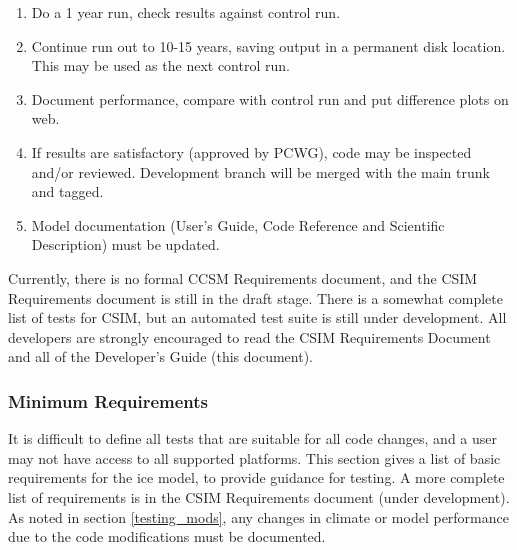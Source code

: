 \begin{enumerate}
  \item  Do a 1 year run, check results against control run.

  \item  Continue run out to 10-15 years, saving output in a permanent disk location.
         This may be used as the next control run.

  \item  Document performance, compare with control run and put difference plots on web.

  \item  If results are satisfactory (approved by PCWG), code may be inspected
         and/or reviewed. Development branch will be merged with the main trunk
         and tagged.

  \item  Model documentation (User's Guide, Code Reference and Scientific Description)
         must be updated.

\end{enumerate}

Currently, there is no formal CCSM Requirements document, and the CSIM Requirements
document is still in the draft stage.  There is a somewhat complete list
of tests for CSIM, but an automated test suite is still under development.
All developers are strongly encouraged to read the CSIM Requirements Document
and all of the Developer's Guide (this document).

\subsubsection*{Minimum Requirements}

It is difficult to define all tests that are suitable for all code changes,
and a user may not have access to all supported platforms.  This section gives
a list of basic requirements for the ice model, to provide guidance for testing.
A more complete list of requirements is in the CSIM Requirements document
(under development).  As noted in section \ref{testing_mods},
any changes in climate or model performance due to the code modifications
must be documented.

